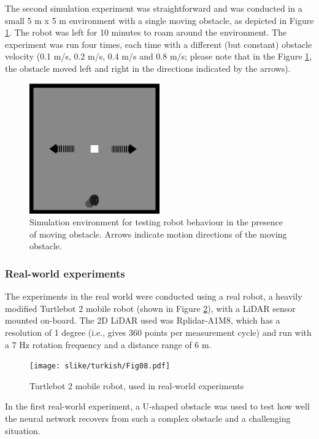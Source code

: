 The second simulation experiment was straightforward and was conducted in a small 5 m x 5 m environment with a single moving obstacle, as depicted in Figure \ref{fig:Fig07}. The robot was left for 10 minutes to roam around the environment. The experiment was run four times, each time with a different (but constant) obstacle velocity (0.1 m/s, 0.2 m/s, 0.4 m/s and 0.8 m/s; please note that in the Figure \ref{fig:Fig07}, the obstacle moved left and right in the directions indicated by the arrows). 

\begin{figure}
    \centering
    \includegraphics[width=0.5\textwidth]{slike/turkish/Fig07.png}
    \caption{Simulation environment for testing robot behaviour in the presence of moving obstacle. Arrows indicate motion directions of the moving obstacle.}
    \label{fig:Fig07}
\end{figure}

\subsubsection{Real-world experiments}

The experiments in the real world were conducted using a real robot, a heavily modified Turtlebot 2 mobile robot (shown in Figure \ref{fig:Fig08}), with a LiDAR sensor mounted on-board. The 2D LiDAR used was Rplidar-A1M8, which has a resolution of 1 degree (i.e., gives 360 points per measurement cycle) and run with a 7 Hz rotation frequency and a distance range of 6 m. 

\begin{figure}
    \centering
    \texttt{[image: slike/turkish/Fig08.pdf]}
    \caption{Turtlebot 2 mobile robot, used in real-world experiments}
    \label{fig:Fig08}
\end{figure}

In the first real-world experiment, a U-shaped obstacle was used to test how well the neural network recovers from such a complex obstacle and a challenging situation. 


